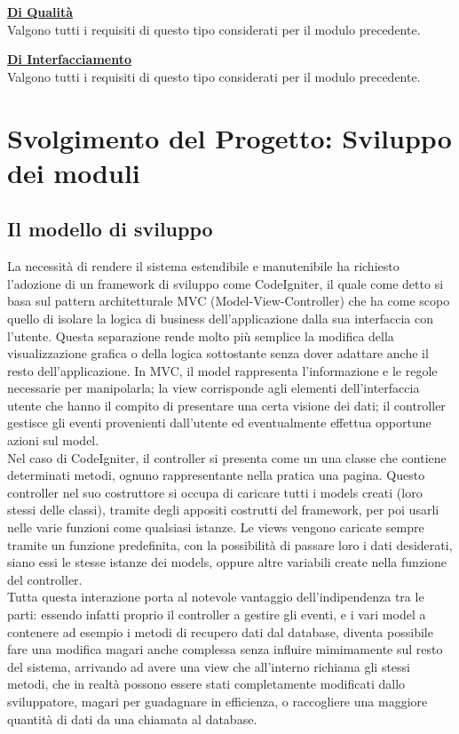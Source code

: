 \underline{\textbf{Di Qualit\`a}}\\
Valgono tutti i requisiti di questo tipo considerati per il modulo precedente.

\underline{\textbf{Di Interfacciamento}}\\
Valgono tutti i requisiti di questo tipo considerati per il modulo precedente.

\chapter{Svolgimento del Progetto: Sviluppo dei moduli}
\section{Il modello di sviluppo}
La necessit\`a di rendere il sistema estendibile e manutenibile ha richiesto l'adozione di un framework di sviluppo come CodeIgniter, il quale come detto si basa sul pattern architetturale MVC (Model-View-Controller) che ha come scopo quello di isolare la logica di business dell'applicazione dalla sua interfaccia con l'utente. Questa separazione rende molto pi\`u semplice la modifica della visualizzazione grafica o della logica sottostante senza dover adattare anche il resto dell'applicazione. In MVC, il model rappresenta l'informazione e le regole necessarie per manipolarla; la view corrisponde agli elementi dell'interfaccia utente che hanno il compito di presentare una certa visione dei dati; il controller gestisce gli eventi provenienti dall'utente ed eventualmente effettua opportune azioni sul model. \\
Nel caso di CodeIgniter, il controller si presenta come un una classe che contiene determinati metodi, ognuno rappresentante nella pratica una pagina. Questo controller nel suo costruttore si occupa di caricare tutti i models creati (loro stessi delle classi), tramite degli appositi costrutti del framework, per poi usarli nelle varie funzioni come qualsiasi istanze. Le views vengono caricate sempre tramite un funzione predefinita, con la possibilit\`a di passare loro i dati desiderati, siano essi le stesse istanze dei models, oppure altre variabili create nella funzione del controller.  \\
Tutta questa interazione porta al notevole vantaggio dell'indipendenza tra le parti: essendo infatti proprio il controller a gestire gli eventi, e i vari model a contenere ad esempio i metodi di recupero dati dal database, diventa possibile fare una modifica magari anche complessa senza influire mimimamente sul resto del sistema, arrivando ad avere una view che all'interno richiama gli stessi metodi, che in realt\`a possono essere stati completamente modificati dallo sviluppatore, magari per guadagnare in efficienza, o raccogliere una maggiore quantit\`a di dati da una chiamata al database.

